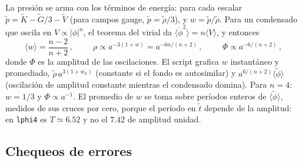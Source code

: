 \documentclass[11pt]{article}
\begin{document}
            La presión se arma con los términos de energía: para cada escalar $\tilde p = \tilde K - \tilde G/3 - \tilde V$ (para campos gauge, $\tilde p = \tilde\rho/3$), y $w = \tilde p / \tilde\rho$. Para un condensado que oscila en $V \propto |\phi|^n$, el teorema del virial da $\langle\dot\phi^2\rangle = n\langle V\rangle$, y entonces
            \begin{equation}
                \langle w \rangle = \frac{n-2}{n+2} \, , \hspace{1cm}
                \rho \propto a^{-3(1+w)} = a^{-6n/(n+2)} \, , \hspace{1cm}
                \Phi \propto a^{-6/(n+2)} \, ,
            \end{equation}
            donde $\Phi$ es la amplitud de las oscilaciones. El script grafica $w$ instantáneo y promediado, $\tilde\rho \, a^{3(1+w_n)}$ (constante si el fondo es autosimilar) y $a^{6/(n+2)}\langle\tilde\phi\rangle$ (oscilación de amplitud constante mientras el condensado domina). Para $n = 4$: $w = 1/3$ y $\Phi \propto a^{-1}$. El promedio de $w$ se toma sobre períodos enteros de $\langle\tilde\phi\rangle$, medidos de sus cruces por cero, porque el período en $\tilde t$ depende de la amplitud: en \texttt{lphi4} es $T \simeq 6.52$ y no el $7.42$ de amplitud unidad.

        \subsection{Chequeos de errores}
\end{document}
